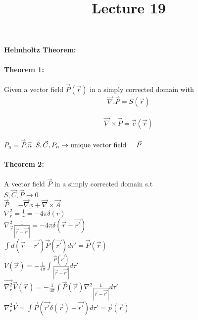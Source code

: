 \documentclass{report}
\begin{document}
\title{Lecture 19}
\maketitle

\paragraph*{Helmholtz Theorem:} \paragraph*{Theorem 1:}
Given a vector field $\vec{P}(\vec{r})$ in a simply corrected domain with\\
$$\vec{\nabla}.\vec{P}=S(\vec{r})$$\\
$$\vec{\nabla}\times\vec{P}=\vec{c}(\vec{r})$$\\

$P_{n}=\vec{P}.\hat{n}$\
$S, \vec{C}, P_{n} \rightarrow \mbox{unique vector field} \hspace{5mm}\vec{P}$\

\paragraph*{Theorem 2:}
A vector field $\vec{P}$ in a simply corrected domain s.t \\

$S, \vec{C}, \vec{P} \rightarrow 0$\\

$\vec{P}=-\vec{\nabla}\phi+\vec{\nabla}\times
\vec{A}$\\

$\nabla_{r}^{2}=\frac{1}{r}=-4 \pi \delta(r)$\\

$\nabla_{\vec{r}}^{2}\frac{1}{|\vec{r}-\vec{r'}|}=-4\pi\delta(\vec{r}-\vec{r'})$\\

$\int d(\vec{r}-\vec{r'})\vec{P}(\vec{r'})d \tau'=\vec{P}(\vec{r})$\\

$V(\vec{r})=-\frac{1}{4 \pi}\int\frac{\vec{P}(\vec{r'})}{|\vec{r}-\vec{r'}|}d \tau'$\\

$\vec{\nabla_{r}^{2}}\vec{V}(\vec{r})=-\frac{1}{4 \pi}\int \vec{P}(\vec{r})\nabla^{2}\frac{1}{|\vec{r}-\vec{r'}|}d \tau'$\\

$\nabla_{r}^{2}\vec{V}=\int\vec{P}(\vec{r'}\delta(\vec{r})-\vec{r'})d \tau'=\vec{p}(\vec{r})$\\
\end{document}
